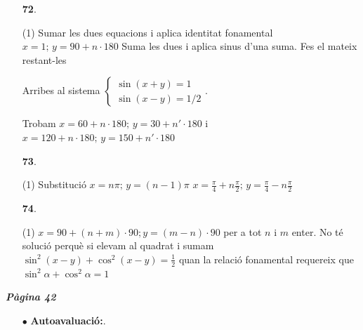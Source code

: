 \documentclass[a4paper, pdf, twoside]{book}
\begin{document}
\begin{multicols}{2}
\begin{enumerate}
 \item[\fontfamily{phv}\selectfont\color{blue}\textbf{72}. ] 
 \begin{tasks}[column-sep=1em, item-indent=1.3333em](1)
	 \task* Sumar les dues equacions i aplica identitat fonamental $x=1;\,y=90+n\cdot 180$
	 \task* Suma les dues i aplica sinus d'una suma. Fes el mateix restant-les\par Arribes al sistema $\left \{\begin {array}{l} \sin (x+y)=1 \\ \sin (x-y)=1/2 \end {array} \right .$.\par Trobam $x=60+n\cdot 180;\,y=30+n'\cdot 180$ i $x=120+n\cdot 180;\,y=150+n'\cdot 180$ 
\end{tasks}
\vspace{0.25cm}



 \item[\fontfamily{phv}\selectfont\color{blue}\textbf{73}. ] 
 \begin{tasks}[column-sep=1em, item-indent=1.3333em](1)
	 \task* Substitució $x=n\pi ;\,y=(n-1)\pi $
	 \task* $x=\frac {\pi }{4}+n\frac {\pi }{2};\,y=\frac {\pi }{4}-n\frac {\pi }{2}$
\end{tasks}
\vspace{0.25cm}



 \item[\fontfamily{phv}\selectfont\color{blue}\textbf{74}. ] 
 \begin{tasks}[column-sep=1em, item-indent=1.3333em](1)
	 \task* $x=90+(n+m)\cdot 90; y=(m-n)\cdot 90$
	 \task per a tot $n$ i $m$ enter.
	 \task* No té solució perquè si elevam al quadrat i sumam $\sin ^2 (x-y)+\cos ^2 (x-y)=\frac {1}{2}$
	 \task* quan la relació fonamental requereix que $\sin ^2 \alpha +\cos ^2 \alpha =1$
\end{tasks}
 \end{enumerate}
\vspace{0.3cm}


{\textbf{\em Pàgina 42}} \hrulefill
\begin{enumerate}
\vspace{0.25cm}
 \item[$\bullet$ ] {\selectfont\color{blue}\textbf{Autoavaluació:}. }

 \end{enumerate}
\begin{enumerate}
\vspace{0.25cm}



\end{enumerate}
\end{multicols}
\end{document}
